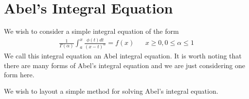 \documentclass{unswmaths}
\begin{document}
\section*{Abel's Integral Equation}

We wish to consider a simple integral equation of the form
\begin{align}
	\label{eqn:abel}
	\frac{1}{\Gamma(\alpha)}\int_a^x \frac{\phi(t)dt}{(x-t)^\alpha} = f(x) 	& & x \geq 0, 0 \leq \alpha \leq 1
\end{align}
We call this integral equation an Abel integral equation. It is worth noting that there are many forms of Abel's integral
equation and we are just considering one form here.

We wish to layout a simple method for solving Abel's integral equation.
\end{document}
